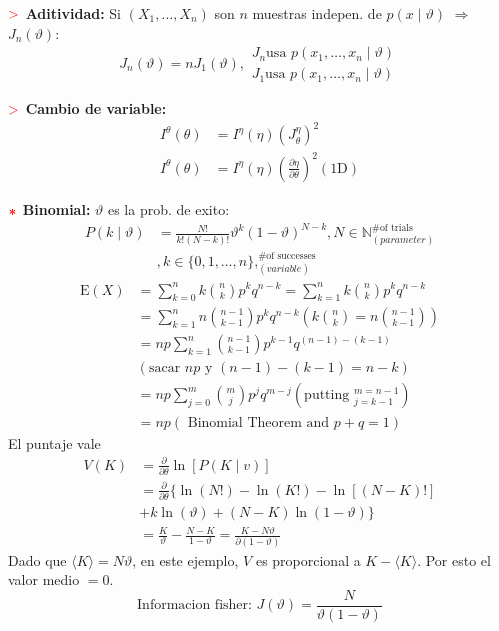 \documentclass[%
 reprint,
 amsmath,amssymb,
 aps,
]{revtex4-1}
\begin{document}
\textbf{$\textcolor{red}{\mathbf{>}}$ Aditividad:} 
Si $\left(X_{1}, \ldots, X_{n}\right)$ son $n$ muestras indepen. de $p(x \mid \vartheta)$ $\Rightarrow$ $J_{n}(\vartheta)$:
$$
J_{n}(\vartheta)=n J_{1}(\vartheta), 
\begin{aligned}
  J_{n} \text{usa } p\left(x_{1}, \ldots, x_{n} \mid \vartheta\right) \\
  J_{1} \text{usa } p\left(x_{1}, \ldots, x_{n} \mid \vartheta\right)
\end{aligned}
$$

\textbf{$\textcolor{red}{\mathbf{>}}$ Cambio de variable:} 
$$
\begin{aligned}
I^{\theta}(\theta) &=I^{\eta}(\eta)\left(J_{\theta}^{\eta}\right)^{2} \\
I^{\theta}(\theta) &=I^{\eta}(\eta)\left( \frac{\partial \eta}{\partial \theta} \right)^{2} (\text{1D})
\end{aligned}
$$

\textbf{$\textcolor{red}{\color{red}{\boldsymbol{*}}}$ Binomial:} $\vartheta$ es la prob. de exito:
$$
\begin{aligned}
  P(k \mid \vartheta)
  &=\frac{N !}{k !(N-k) !} \vartheta^{k}(1-\vartheta)^{N-k} , N \in \mathbb{N} ^\text{\# of trials}_{(parameter)}\\
  &, k \in\{0,1, \ldots, n\}, ^\text{\# of successes}_{(variable)}
\end{aligned}
$$
$$
\begin{aligned}
    \mathrm{E}(X) 
    &= \sum_{k=0}^{n} k {n \choose k} p^{k} q^{n-k} = \sum_{k=1}^{n} k {n \choose k} p^{k} q^{n-k} \\
    &= \sum_{k=1}^{n} n {n-1 \choose k-1} p^{k} q^{n-k} 
    \left( 
        k {n \choose k} =n {n-1 \choose k-1} 
    \right) 
    \\
    &=n p \sum_{k=1}^{n}{n-1 \choose k-1} p^{k-1} q^{(n-1)-(k-1)} 
    \\ &
    \left( 
        \text {sacar } n p \text { y }
        (n-1)-(k-1)=n-k
    \right) 
    \\
    &=n p \sum_{j=0}^{m} {m \choose j} p^{j} q^{m-j}
    \left( 
        \text{putting } 
        ^{m=n-1}_{j=k-1}
    \right) 
    \\
    &=n p \left( \text { Binomial Theorem and } p+q=1 \right) 
\end{aligned}
$$
El puntaje vale
$$
\begin{aligned}
V(K) &=\frac{\partial}{\partial \theta} \ln [P(K \mid v)] \\
&=\frac{\partial}{\partial \theta}\{\ln (N !)-\ln (K !)-\ln [(N-K) !] \\
&+k \ln (\vartheta)+(N-K) \ln (1-\vartheta)\} \\
&=\frac{K}{\vartheta}-\frac{N-K}{1-\vartheta}=\frac{K-N \vartheta}{\partial(1-\vartheta)}
\end{aligned}
$$
Dado que $\langle K\rangle=N \vartheta$, en este ejemplo, $V$ es proporcional a $K-\langle K\rangle$. Por esto el valor medio $=0$.
$$\text{Informacion fisher: }J(\vartheta)=\frac{N}{\vartheta(1-\vartheta)}$$
\end{document}

